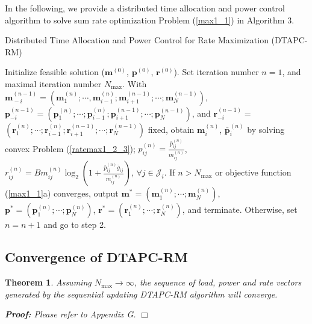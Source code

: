 \documentclass[journal]{IEEEtran}
\newtheorem{theorem}{Theorem}
\begin{document}
In the following, we provide a distributed time allocation and power control  algorithm to solve sum rate optimization Problem (\ref{max1_1}) in Algorithm 3.
\begin{algorithm}[h]
\caption{Distributed Time Allocation and Power Control for Rate Maximization (DTAPC-RM)}
\label{alg:Framwork1}
\begin{algorithmic}[1]
\State Initialize feasible solution ($\pmb{m}^{(0)}$, $\pmb{p}^{(0)}$, $\pmb{r}^{(0)}$).
Set iteration number $n=1$, and maximal iteration number $N_{\max}$.
\State With $\pmb{m}_{\!-\!i}^{(n\!-\!1)}\!\!=\!(\pmb{m}_1^{(n)}; \!\cdots\!, \pmb{m}_{i\!-\!1}^{(n)};
\pmb{m}_{i\!+\!1}^{(n\!-\!1)}; \!\cdots\!; \pmb{m}_N^{(n\!-\!1)})$,
 $\pmb{p}_{-i}^{(n\!-\!1)}\!=\! (\pmb{p}_1^{(n)};  \!\cdots\!; \pmb{p}_{i\!-\!1}^{(n)};
\pmb{p}_{i\!+\!1}^{(n\!-\!1)}; \!\cdots\!; \pmb{p}_N^{(n\!-\!1)})$, and
 $\pmb{r}_{-i}^{(n-1)}=$ $(\pmb{r}_1^{(n)};  \cdots; \pmb{r}_{i-1}^{(n)};
\pmb{r}_{i+1}^{(n-1)}; \cdots; \pmb{r}_N^{(n-1)})$
fixed, obtain $\pmb m_i^{(n)}$, $\pmb {\bar p}_i^{(n)}$  by solving convex Problem (\ref{ratemax1_2_3});
\State $p_{ij}^{(n)}=\frac{\bar p_{ij}^{(n)}}{m_{ij}^{(n)}}$, $r_{ij}^{(n)}=B m_{ij}^{(n)}\log_2\left(1+ \frac{\bar p_{ij}^{(n)} \bar g_{ij}} {m_{ij}^{(n)}} \right)$, $\forall j \in \mathcal J_i$.
\EndFor
\State
If $n > N_{\max}$ or objective function (\ref{max1_1}a) converges, output $\pmb m^*=(\pmb m_1^{(n)}; \cdots; \pmb m_N^{(n)})$, $\pmb p^*=(\pmb p_1^{(n)}; \cdots; \pmb p_N^{(n)})$, $\pmb r^*=(\pmb r_1^{(n)}; \cdots; \pmb r_N^{(n)})$, and
terminate.
Otherwise, set $n=n+1$ and go to step 2.
\end{algorithmic}
\end{algorithm}

\subsection{Convergence of DTAPC-RM}
\begin{theorem}\label{rate_convergence}
Assuming $N_{\max}\rightarrow \infty$, the sequence of load, power and rate vectors generated by the sequential updating DTAPC-RM algorithm will converge.
\end{theorem}
\itshape \textbf{Proof:}  \upshape
Please refer to Appendix G.
\hfill $\Box$
\end{document}
